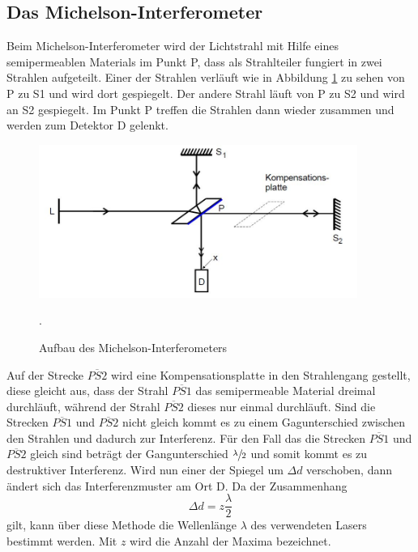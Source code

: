 \subsection{Das Michelson-Interferometer}
Beim Michelson-Interferometer wird der Lichtstrahl mit Hilfe eines semipermeablen Materials im Punkt P, dass
als Strahlteiler fungiert in zwei Strahlen aufgeteilt. Einer der Strahlen verläuft wie in
Abbildung \ref{fig:michel} zu sehen von P zu S1 und wird dort gespiegelt. Der andere Strahl läuft von
P zu S2 und wird an S2 gespiegelt. Im Punkt P treffen die Strahlen dann wieder zusammen und
werden zum Detektor D gelenkt.

\begin{figure}[H]
  \centering
  \includegraphics[height=5cm]{Michel.JPG}
  \caption{Aufbau des Michelson-Interferometers}
  \label{fig:michel}
  \cite{skript}.
\end{figure}

Auf der Strecke $\overline{PS2}$ wird eine Kompensationsplatte in den Strahlengang gestellt, diese
gleicht aus, dass der Strahl $\overline{PS1}$ das semipermeable Material dreimal durchläuft, während
der Strahl $\overline{PS2}$ dieses nur einmal durchläuft.
Sind die Strecken $\overline{PS1}$ und $\overline{PS2}$ nicht gleich kommt es zu einem Gagunterschied
zwischen den Strahlen und dadurch zur Interferenz.
Für den Fall das die Strecken $\overline{PS1}$ und $\overline{PS2}$ gleich sind beträgt der
Gangunterschied $\sfrac{\lambda}{2}$ und somit kommt es zu destruktiver Interferenz.
Wird nun einer der Spiegel um $\Delta d$ verschoben, dann ändert sich das Interferenzmuster
am Ort D. Da der Zusammenhang
\begin{equation}
  \Delta d = z \frac{\lambda}{2}
  \label{eqn:interferenz}
\end{equation}
gilt, kann über diese Methode die Wellenlänge $\lambda$ des verwendeten Lasers bestimmt werden.
Mit $z$ wird die Anzahl der Maxima bezeichnet.\\

